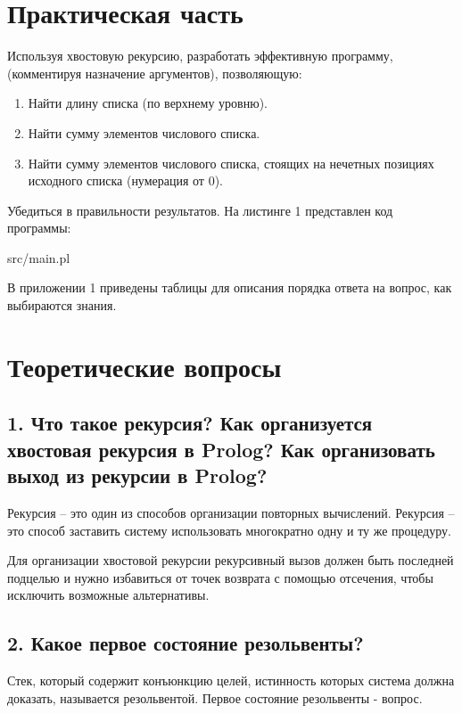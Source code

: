 \chapter*{Практическая часть}

Используя хвостовую рекурсию,
разработать эффективную программу, (комментируя назначение аргументов), позволяющую:
\begin{enumerate}
	\item Найти длину списка (по верхнему уровню).
	\item Найти сумму элементов числового списка.
	\item Найти сумму элементов числового списка, стоящих на нечетных позициях исходного списка (нумерация от 0).
\end{enumerate}

Убедиться в правильности результатов.
На листинге 1 представлен код программы:

\FloatBarrier
\begin{lstinputlisting}[style={lsp}]{src/main.pl}
\end{lstinputlisting}
\FloatBarrier

В приложении 1 приведены таблицы для описания порядка ответа на вопрос, как выбираются знания.

\chapter*{Теоретические вопросы}

\section*{1. Что такое рекурсия? Как организуется хвостовая рекурсия в Prolog? Как организовать выход из рекурсии в Prolog?}
Рекурсия – это один из способов организации повторных вычислений. Рекурсия – это способ заставить систему использовать многократно одну и ту же процедуру.

Для организации хвостовой рекурсии рекурсивный вызов должен быть последней подцелью и нужно избавиться от точек возврата с помощью отсечения, чтобы исключить возможные альтернативы.

\section*{2. Какое первое состояние резольвенты?}
Стек, который содержит конъюнкцию целей, истинность которых система должна доказать, называется
резольвентой. Первое состояние резольвенты - вопрос.

